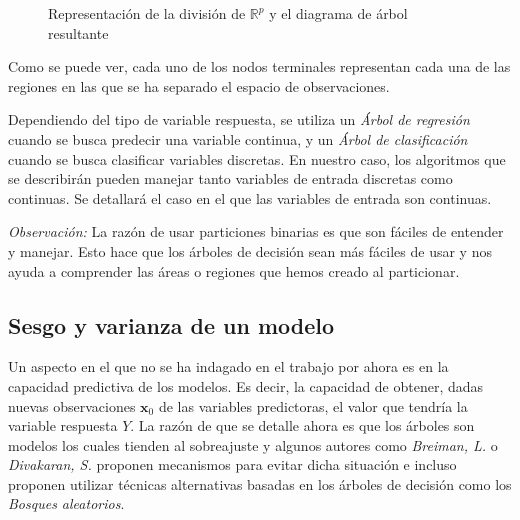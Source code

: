 \begin{figure}[h]
 \centering
 \caption{Representación de la división de $\mathbb{R}^p$ y el diagrama de árbol resultante}
 \label{f:MARC1}
\end{figure}

\noindent Como se puede ver, cada uno de los nodos terminales representan cada una de las regiones en las que se ha separado el espacio de observaciones. 

\noindent Dependiendo del tipo de variable respuesta, se utiliza un \emph{Árbol de regresión} cuando se busca predecir una variable continua, y un \emph{Árbol de clasificación} cuando se busca clasificar variables discretas. En nuestro caso, los algoritmos que se describirán pueden manejar tanto variables de entrada discretas como continuas. Se detallará el caso en el que las variables de entrada son continuas.

\noindent \emph{Observación:} La razón de usar particiones binarias es que son fáciles de entender y manejar. Esto hace que los árboles de decisión sean más fáciles de usar y nos ayuda a comprender las áreas o regiones que hemos creado al particionar. 

\subsection*{Sesgo y varianza de un modelo}

\noindent Un aspecto en el que no se ha indagado en el trabajo por ahora es en la capacidad predictiva de los modelos. Es decir, la capacidad de obtener, dadas nuevas observaciones $\mathbf{x}_0$ de las variables predictoras, el valor que tendría la variable respuesta $Y$. La razón de que se detalle ahora es que los árboles son modelos los cuales tienden al sobreajuste y algunos autores como \emph{Breiman, L.}\cite{Breiman 1984} o \emph{Divakaran, S.}\cite{Divakaran 2022} proponen mecanismos para evitar dicha situación e incluso proponen utilizar técnicas alternativas basadas en los árboles de decisión como los  \emph{Bosques aleatorios}\cite{Breiman 2001}. 

